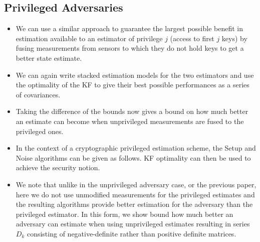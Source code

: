 \documentclass[conference]{IEEEtran}
\begin{document}
\subsection{Privileged Adversaries}
\begin{itemize}
  \item We can use a similar approach to guarantee the largest possible benefit in estimation available to an estimator of privilege $j$ (access to first $j$ keys) by fusing measurements from sensors to which they do not hold keys to get a better state estimate.
  \item We can again write stacked estimation models for the two estimators and use the optimality of the KF to give their best possible performances as a series of covariances.
  \item Taking the difference of the bounds now gives a bound on how much better an estimate can become when unprivileged measurements are fused to the privileged ones.
  \item In the context of a cryptographic privileged estimation scheme, the Setup and Noise algorithms can be given as follows. KF optimality can then be used to achieve the security notion.
  \item We note that unlike in the unprivileged adversary case, or the previous paper, here we do not use unmodified measurements for the privileged estimates and the resulting algorithms provide better estimation for the adversary than the privileged estimator. In this form, we show bound how much better an adversary can estimate when using unprivileged estimates resulting in series $D_k$ consisting of negative-definite rather than positive definite matrices.
\end{itemize}
\end{document}
